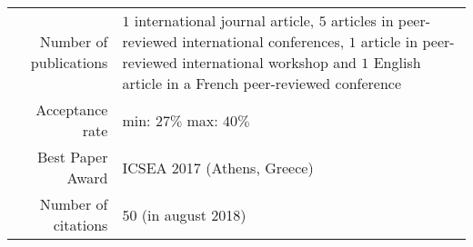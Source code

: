 
\begin{tabular}{r @{~$\rangle$~} p{}}

Number of publications & $1$ international journal article, $5$ articles in peer-reviewed international conferences, $1$ article in peer-reviewed international workshop and $1$ English article in a French peer-reviewed conference \\
Acceptance rate & min: $27\%$ max: $40\%$\\
Best Paper Award & ICSEA 2017 (Athens, Greece)\\
Number of citations & $50$ (in august 2018)\\
\end{tabular}